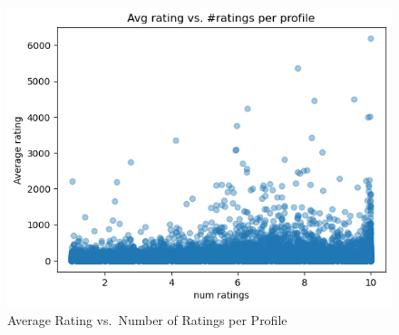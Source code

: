 \begin{figure}[H]
  \centering
  \includegraphics[width=0.6\linewidth]{figures/output.png}
  \caption{Average Rating vs.\ Number of Ratings per Profile}
  \label{fig:rating-vs-count}
\end{figure}
